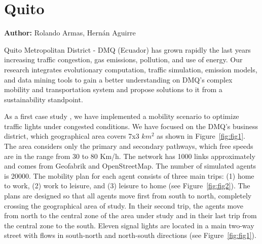\section{Quito}
\label{sec:quito}
\hfill \textbf{Author:} Rolando Armas, Hernán Aguirre

Quito Metropolitan District - DMQ (Ecuador) has grown rapidly the last years increasing traffic congestion, gas emissions, pollution, and use of energy. Our research integrates evolutionary computation, traffic simulation, emission models, and data mining tools to gain a better understanding on DMQ’s complex mobility and transportation system and propose solutions to it from a sustainability standpoint.

As a first case study \citep[][]{ArmasEtAl_SEAL_2014}, we have implemented a mobility scenario to optimize traffic lights under congested conditions. We have focused on the
DMQ’s business district, which geographical area covers 7x3 $km^2$ as shown in Figure~\ref{fig:fig1}. The area considers only the primary and secondary pathways, which free speeds are in the range from 30 to 80 Km/h. The network has 1000 links approximately and comes from Geofabrik and OpenStreetMap. The number of simulated agents is 20000. The mobility plan for each agent consists of three main trips: (1) home to work, (2) work to leisure, and (3) leisure to home (see Figure~\ref{fig:fig2}). The plans are designed so that all agents move first from south to north, completely crossing the geographical area of study. In their second trip, the agents move from north to the central zone of the area under study and in their last trip from the central zone to the south. Eleven signal lights are located in a main two-way street with flows in south-north and north-south directions (see Figure~\ref{fig:fig1}).

